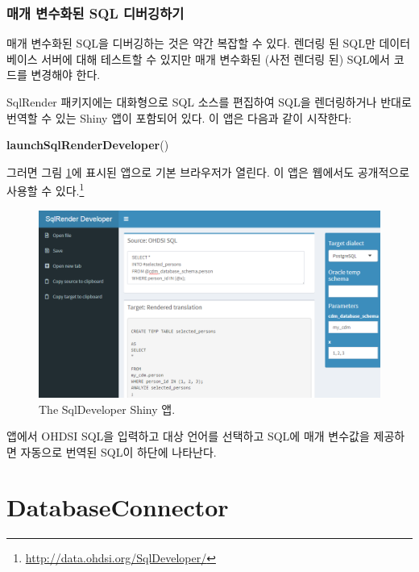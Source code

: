 \documentclass[10.5pt]{book}
\newenvironment{Shaded}{\begin{snugshade}}{\end{snugshade}}
\newcommand{\KeywordTok}[1]{\textcolor[rgb]{0.13,0.29,0.53}{\textbf{#1}}}
\newcommand{\NormalTok}[1]{#1}
\let\rmarkdownfootnote\footnote%
\def\footnote{\protect\rmarkdownfootnote}
\theoremstyle{definition}
\theoremstyle{definition}
\theoremstyle{definition}
\theoremstyle{remark}
\begin{document}
\subsubsection*{매개 변수화된 SQL 디버깅하기}\label{--sql-}

매개 변수화된 SQL을 디버깅하는 것은 약간 복잡할 수 있다. 렌더링 된 SQL만
데이터베이스 서버에 대해 테스트할 수 있지만 매개 변수화된 (사전 렌더링
된) SQL에서 코드를 변경해야 한다. 

SqlRender 패키지에는 대화형으로 SQL 소스를 편집하여 SQL을 렌더링하거나
반대로 번역할 수 있는 Shiny 앱이 포함되어 있다. 이 앱은 다음과 같이
시작한다:

\begin{Shaded}
\begin{Highlighting}[]
\KeywordTok{launchSqlRenderDeveloper}\NormalTok{()}
\end{Highlighting}
\end{Shaded}

그러면 그림 \ref{fig:sqlDeveloper}에 표시된 앱으로 기본 브라우저가
열린다. 이 앱은 웹에서도 공개적으로 사용할 수 있다.\footnote{\url{http://data.ohdsi.org/SqlDeveloper/}}

\begin{figure}

{\centering \includegraphics[width=1\linewidth]{images/SqlAndR/sqlDeveloper} 

}

\caption{The SqlDeveloper Shiny 앱.}\label{fig:sqlDeveloper}
\end{figure}

앱에서 OHDSI SQL을 입력하고 대상 언어를 선택하고 SQL에 매개 변수값을
제공하면 자동으로 번역된 SQL이 하단에 나타난다.

\hypertarget{DatabaseConnector}{\section{DatabaseConnector}\label{DatabaseConnector}}
\end{document}
